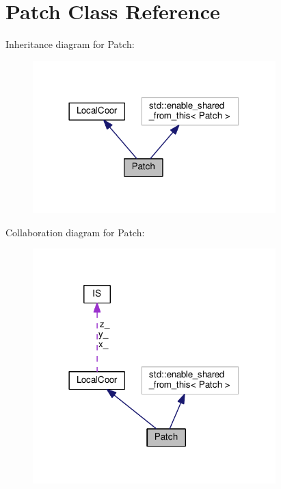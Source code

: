 \hypertarget{classPatch}{\section{Patch Class Reference}
\label{classPatch}
}


Inheritance diagram for Patch\+:\nopagebreak
\begin{figure}[H]
\begin{center}
\leavevmode
\includegraphics[width=266pt]{classPatch__inherit__graph}
\end{center}
\end{figure}


Collaboration diagram for Patch\+:\nopagebreak
\begin{figure}[H]
\begin{center}
\leavevmode
\includegraphics[width=266pt]{classPatch__coll__graph}
\end{center}
\end{figure}
